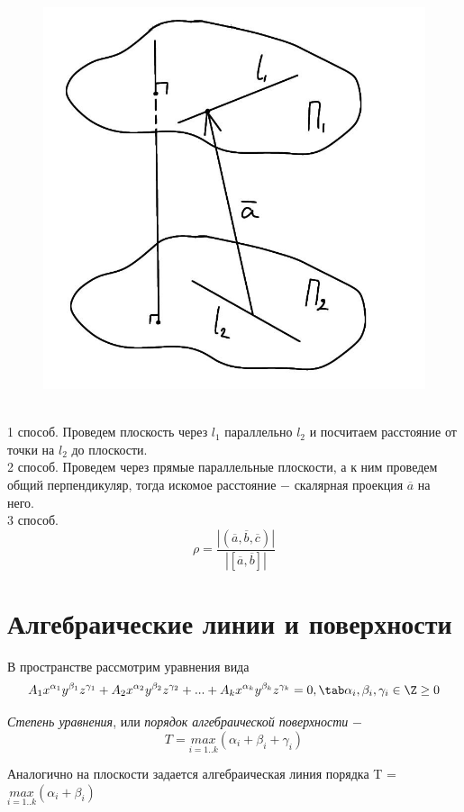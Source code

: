 \begin{figure}
    \includegraphics[width=0.84\linewidth]{images/3.6.jpeg}
\end{figure}

\tab\\

1 способ. Проведем плоскость через $l_1$ параллельно $l_2$  и посчитаем расстояние от точки на $l_2$  до плоскости.\\

2 способ. Проведем через прямые параллельные плоскости, а к ним проведем общий перпендикуляр, тогда искомое расстояние $-$ скалярная проекция $\overline{a}$ на него.\\

3 способ. \[
\rho = \dfrac{|(\overline{a}, \overline{b}, \overline{c})|}{|[\overline{a}, \overline{b}]|}
\]
\section{Алгебраические линии и поверхности}

В пространстве рассмотрим уравнения вида
\[
A_1 x^{\alpha_1}y^{\beta_1}z^{\gamma_1} + A_2 x^{\alpha_2}y^{\beta_2}z^{\gamma_2} + ... + A_k x^{\alpha_k}y^{\beta_k}z^{\gamma_k} = 0,\tab \alpha_i, \beta_i, \gamma_i \in \Z \geq 0
\]

\begin{definition}
    \textit{Степень уравнения}, или \textit{порядок алгебраической поверхности} $-$
    \[
    T = \underset{i=1..k}{max}(\alpha_i + \beta_i + \gamma_i)
    \]

    Аналогично на плоскости задается алгебраическая линия порядка T = $\underset{i=1..k}{max}(\alpha_i + \beta_i)$
\end{definition}

